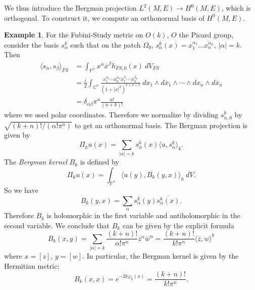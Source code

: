 \documentclass[12pt]{report}
\newcommand{\CC}{\mathbb{C}}
\newcommand{\PP}{\mathbb{P}}
\newcommand{\dfn}[1]{\emph{#1}\index{#1}}
\theoremstyle{definition}
\newtheorem{example}[theorem]{Example}
\begin{document}
We thus introduce the Bergman projection $L^2(M, E) \to H^0(M, E)$, which is orthogonal. To construct it, we compute an orthonormal basis of $H^0(M, E)$.
\begin{example}
    For the Fubini-Study metric on $O(k)$, $O$ the Picard group, consider the basis $s_\alpha^k$ such that on the patch $\Omega_0$, $s_\alpha^k(x) = x_1^{\alpha_1}\dots x_n^{\alpha_n}$, $|\alpha| = k$. Then
\begin{align*} 
    \langle s_\alpha, s_\beta\rangle_{FS} &= \int_{\PP^n} x^\alpha \overline x^\beta h_{FS,0}(x) ~dV_{FS} \\&= \frac{i}{2} \int_{\CC^n} \frac{x_1^{\alpha_1} \cdots x_n^{\alpha_n} \overline x_1^{\beta_1} \cdots \overline x_n^{\beta_n}}{(1+|x|^2)^{k+n+1}} ~dx_1\wedge d\overline x_1\wedge \cdots \wedge dx_n \wedge d\overline x_n\\
    &= \delta_{\alpha\beta} \pi^n \frac{\alpha!}{(n+k)!}
\end{align*}
    where we used polar coordinates. Therefore we normalize by dividing $s^k_{\alpha,0}$ by $\sqrt{(k+n)!/(\alpha!\pi^n)}$ to get an orthonormal basis. The Bergman projection is given by
    $$\Pi_ku(x) = \sum_{|\alpha| = k} s_\alpha^k(x) \langle u, s_\alpha^k\rangle_k.$$
    The \dfn{Bergman kernel} $B_k$ is defined by
    $$\Pi_ku(x) = \int_{\PP^n} \langle u(y), B_k(y, x)\rangle_h ~dV.$$
    So we have
    $$B_k(y, x) = \sum_\alpha s_\alpha^k(y) \overline{s_\alpha^k(x)}.$$
    Therefore $B_k$ is holomorphic in the first variable and antiholomorphic in the second variable. We conclude that $B_k$ can be given by the explicit formula
    $$B_k(x, y) = \sum_{|\alpha| = k } \frac{(k+n)!}{\alpha!\pi^n} z^\alpha \overline w^\alpha = \frac{(k+n)!}{k!\pi^n} \langle z, w\rangle^k$$
    where $x = [z]$, $y = [w]$. In particular, the Bergman kernel is given by the Hermitian metric:
    $$B_k(x, x) = e^{-2k\varphi_0(x)} = \frac{(k+n)!}{k!\pi^n}.$$ 
\end{example}
\end{document}
